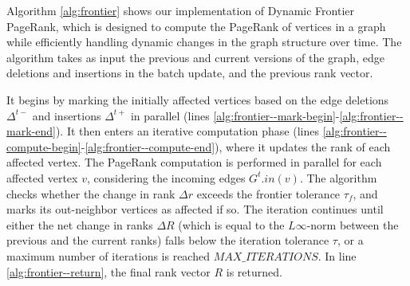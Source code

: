 Algorithm \ref{alg:frontier} shows our implementation of Dynamic Frontier PageRank, which is designed to compute the PageRank of vertices in a graph while efficiently handling dynamic changes in the graph structure over time. The algorithm takes as input the previous and current versions of the graph, edge deletions and insertions in the batch update, and the previous rank vector.

It begins by marking the initially affected vertices based on the edge deletions $\Delta^{t-}$ and insertions $\Delta^{t+}$ in parallel (lines \ref{alg:frontier--mark-begin}-\ref{alg:frontier--mark-end}). It then enters an iterative computation phase (lines \ref{alg:frontier--compute-begin}-\ref{alg:frontier--compute-end}), where it updates the rank of each affected vertex. The PageRank computation is performed in parallel for each affected vertex $v$, considering the incoming edges $G^t.in(v)$. The algorithm checks whether the change in rank $\Delta r$ exceeds the frontier tolerance $\tau_f$, and marks its out-neighbor vertices as affected if so. The iteration continues until either the net change in ranks $\Delta R$ (which is equal to the $L\infty$-norm between the previous and the current ranks) falls below the iteration tolerance $\tau$, or a maximum number of iterations is reached $MAX\_ITERATIONS$. In line \ref{alg:frontier--return}, the final rank vector $R$ is returned.




